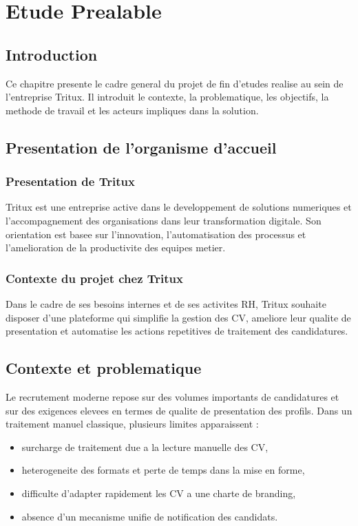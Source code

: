\chapter{Etude Prealable}
\label{chap:etude-prealable}

\section{Introduction}
Ce chapitre presente le cadre general du projet de fin d'etudes realise au sein de l'entreprise Tritux. Il introduit le contexte, la problematique, les objectifs, la methode de travail et les acteurs impliques dans la solution.

\section{Presentation de l'organisme d'accueil}
\subsection{Presentation de Tritux}
Tritux est une entreprise active dans le developpement de solutions numeriques et l'accompagnement des organisations dans leur transformation digitale. Son orientation est basee sur l'innovation, l'automatisation des processus et l'amelioration de la productivite des equipes metier.

\subsection{Contexte du projet chez Tritux}
Dans le cadre de ses besoins internes et de ses activites RH, Tritux souhaite disposer d'une plateforme qui simplifie la gestion des CV, ameliore leur qualite de presentation et automatise les actions repetitives de traitement des candidatures.

\section{Contexte et problematique}
Le recrutement moderne repose sur des volumes importants de candidatures et sur des exigences elevees en termes de qualite de presentation des profils. Dans un traitement manuel classique, plusieurs limites apparaissent :
\begin{itemize}[label=--]
    \item surcharge de traitement due a la lecture manuelle des CV,
    \item heterogeneite des formats et perte de temps dans la mise en forme,
    \item difficulte d'adapter rapidement les CV a une charte de branding,
    \item absence d'un mecanisme unifie de notification des candidats.
\end{itemize}

